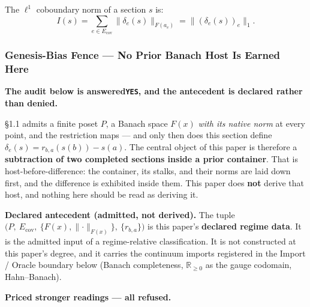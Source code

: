 \documentclass[
  11pt,
]{article}
\begin{document}
The \(\ell^1\) coboundary norm of a section \(s\) is:
\[I(s) = \sum_{e \in E_{\text{cov}}} \|\delta_e(s)\|_{F(a_e)} = \|(\delta_e(s))_e\|_1.\]

\subsubsection{Genesis-Bias Fence --- No Prior Banach Host Is Earned Here}\label{genesis-bias-fence-no-prior-banach-host-is-earned-here}

\textbf{The audit below is answered\texttt{YES}, and the antecedent is declared rather than denied.}

§1.1 admits a finite poset \(P\), a Banach space \(F(x)\) \emph{with its native norm} at every point, and the
restriction maps --- and only then does this section define \(\delta_e(s) = r_{b,a}(s(b)) - s(a)\). The central
object of this paper is therefore a \textbf{subtraction of two completed sections inside a prior container}. That
is host-before-difference: the container, its stalks, and their norms are laid down first, and the difference
is exhibited inside them. This paper does \textbf{not} derive that host, and nothing here should be read as
deriving it.

\textbf{Declared antecedent (admitted, not derived).} The tuple \(\bigl(P,\ E_{\mathrm{cov}},\ \{F(x),\lVert\cdot\rVert_{F(x)}\},\ \{r_{b,a}\}\bigr)\)
is this paper's \textbf{declared regime data}. It is the admitted input of a regime-relative classification. It is
not constructed at this paper's degree, and it carries the continuum imports registered in the Import / Oracle
boundary below (Banach completeness, \(\mathbb{R}_{\geq 0}\) as the gauge codomain, Hahn--Banach).

\textbf{Priced stronger readings --- all refused.}
\end{document}
